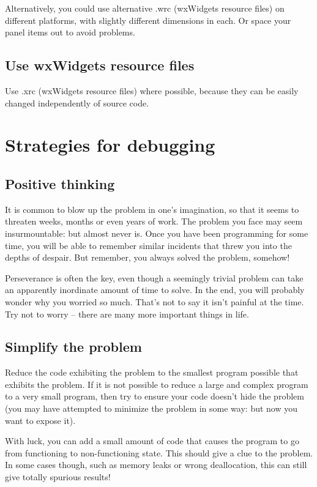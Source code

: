 Alternatively, you could use alternative .wrc (wxWidgets resource files) on different
platforms, with slightly different dimensions in each. Or space your panel items out
to avoid problems.

\subsection{Use wxWidgets resource files}\label{useresources}

Use .xrc (wxWidgets resource files) where possible, because they can be easily changed
independently of source code.

\section{Strategies for debugging}\label{debugstrategies}

\subsection{Positive thinking}\label{positivethinking}

It is common to blow up the problem in one's imagination, so that it seems to threaten
weeks, months or even years of work. The problem you face may seem insurmountable:
but almost never is. Once you have been programming for some time, you will be able
to remember similar incidents that threw you into the depths of despair. But
remember, you always solved the problem, somehow!

Perseverance is often the key, even though a seemingly trivial problem
can take an apparently inordinate amount of time to solve. In the end,
you will probably wonder why you worried so much. That's not to say it
isn't painful at the time. Try not to worry -- there are many more important
things in life.

\subsection{Simplify the problem}\label{simplifyproblem}

Reduce the code exhibiting the problem to the smallest program possible
that exhibits the problem. If it is not possible to reduce a large and
complex program to a very small program, then try to ensure your code
doesn't hide the problem (you may have attempted to minimize the problem
in some way: but now you want to expose it).

With luck, you can add a small amount of code that causes the program
to go from functioning to non-functioning state. This should give a clue
to the problem. In some cases though, such as memory leaks or wrong
deallocation, this can still give totally spurious results!

